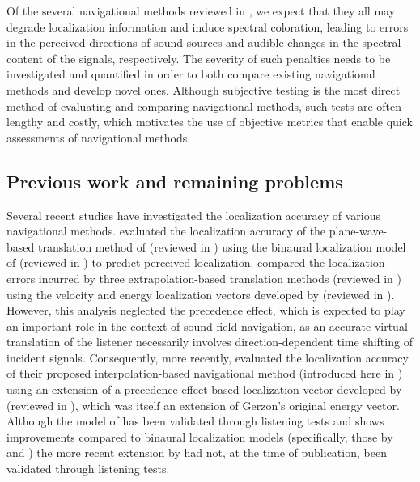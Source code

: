 Of the several navigational methods reviewed in , we expect that they all may degrade localization information and induce spectral coloration, leading to errors in the perceived directions of sound sources and audible changes in the spectral content of the signals, respectively.
The severity of such penalties needs to be investigated and quantified in order to both compare existing navigational methods and develop novel ones.
Although subjective testing is the most direct method of evaluating and comparing navigational methods, such tests are often lengthy and costly, which motivates the use of objective metrics that enable quick assessments of navigational methods.

\subsection{Previous work and remaining problems}
Several recent studies have investigated the localization accuracy of various navigational methods.
\citet{Winter2014} evaluated the localization accuracy of the plane-wave-based translation method of \citet{SchultzSpors2013} (reviewed in ) using the binaural localization model of \citet{Dietz2011} (reviewed in ) to predict perceived localization.
\citet{TylkaChoueiri2015} compared the localization errors incurred by three extrapolation-based translation methods (reviewed in ) using the velocity and energy localization vectors developed by \citet{Gerzon1992} (reviewed in ).
However, this analysis neglected the precedence effect, which is expected to play an important role in the context of sound field navigation, as an accurate virtual translation of the listener necessarily involves direction-dependent time shifting of incident signals.
Consequently, more recently, \citet{TylkaChoueiri2016} evaluated the localization accuracy of their proposed interpolation-based navigational method (introduced here in ) using an extension of a precedence-effect-based localization vector developed by \citet{Stitt2016} (reviewed in ), which was itself an extension of Gerzon's original energy vector.
Although the model of \citeauthor{Stitt2016} has been validated through listening tests and shows improvements compared to binaural localization models (specifically, those by \citet{Dietz2011} and \citet{Lindemann1986a}) the more recent extension by \citet{TylkaChoueiri2016} had not, at the time of publication, been validated through listening tests.


